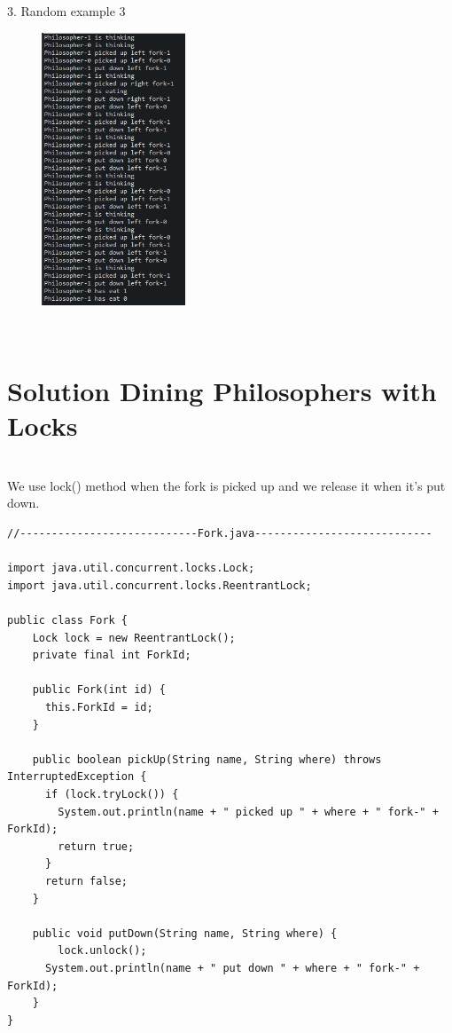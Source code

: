 \documentclass[14pt]{article}
\begin{document}
\begin{center}
3. Random example 3\\
\vspace{10mm}

\includegraphics[height=3.2in, width = 2.5in]{philomon3.png}\\
\end{center}\\

\newpage

\section*{Solution Dining Philosophers with Locks}\\
We use lock() method when the fork is picked up and we release it when it's put down.
\begin{lstlisting}
//----------------------------Fork.java----------------------------

import java.util.concurrent.locks.Lock;
import java.util.concurrent.locks.ReentrantLock;

public class Fork {
    Lock lock = new ReentrantLock();
    private final int ForkId;

    public Fork(int id) {
      this.ForkId = id;
    }

    public boolean pickUp(String name, String where) throws InterruptedException {
      if (lock.tryLock()) {
        System.out.println(name + " picked up " + where + " fork-" + ForkId);
        return true;
      }
      return false;
    }

    public void putDown(String name, String where) {
    	lock.unlock();
      System.out.println(name + " put down " + where + " fork-" + ForkId);
    }
}

\end{lstlisting}
\end{document}
